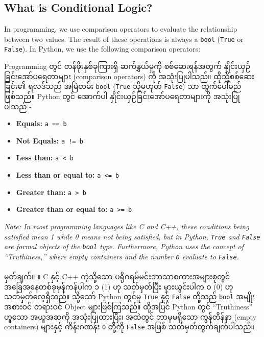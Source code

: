 \documentclass{report}
\begin{document}
\subsection{What is Conditional Logic?}
\begin{tcolorbox}[colback=blue!5!white,colframe=blue!75!black, title=\textbf{Conditional Logic using Comparison Operators}]
In programming, we use comparison operators to evaluate the relationship between two values. The result of these operations is always a \texttt{bool} (\texttt{True} or \texttt{False}). In Python, we use the following comparison operators:

{\burmesefont Programming တွင် တန်ဖိုးနှစ်ခုကြားရှိ ဆက်နွှယ်မှုကို စစ်ဆေးရန်အတွက် နှိုင်းယှဉ်ခြင်းအော်ပရေတာများ (comparison operators) ကို အသုံးပြုပါသည်။ ထိုသို့စစ်ဆေးခြင်း၏ ရလဒ်သည် အမြဲတမ်း \texttt{bool} (\texttt{True} သို့မဟုတ် \texttt{False}) သာ ထွက်ပေါ်မည်ဖြစ်သည်။ Python တွင် အောက်ပါ နှိုင်းယှဉ်ခြင်းအော်ပရေတာများကို အသုံးပြုပါသည် -}

\begin{itemize}
    \item \textbf{Equals:} \texttt{a == b}
    \item \textbf{Not Equals:} \texttt{a != b}
    \item \textbf{Less than:} \texttt{a < b}
    \item \textbf{Less than or equal to:} \texttt{a <= b}
    \item \textbf{Greater than:} \texttt{a > b}
    \item \textbf{Greater than or equal to:} \texttt{a >= b}
\end{itemize}
\end{tcolorbox}

\begin{center}
    \begin{minipage}{0.9\textwidth}
        \small \textit{Note: In most programming languages like C and C++, these conditions being satisfied mean 1 while 0 means not being satisfied, but in Python, \texttt{True} and \texttt{False} are formal objects of the \texttt{bool} type. Furthermore, Python uses the concept of ``Truthiness,'' where empty containers and the number \texttt{0} evaluate to \texttt{False}.}
        \\\\
        {\burmesefont မှတ်ချက်။ ။ C နှင့် C++ ကဲ့သို့သော ပရိုဂရမ်မင်းဘာသာစကားအများစုတွင် အခြေအနေတစ်ခုမှန်ကန်ပါက ၁ (1) ဟု သတ်မှတ်ပြီး မှားယွင်းပါက ၀ (0) ဟု သတ်မှတ်လေ့ရှိသည်။ သို့သော် Python တွင်မူ \texttt{True} နှင့် \texttt{False} တို့သည် \texttt{bool} အမျိုးအစားဝင် တရားဝင် Object များဖြစ်ကြသည်။ ထို့အပြင် Python တွင် ``Truthiness'' ဟူသော အယူအဆကို အသုံးပြုထားပြီး၊ အထဲတွင် ဘာမှမရှိသော ကွန်တိန်နာ (empty containers) များနှင့် ကိန်းဂဏန်း \texttt{0} တို့ကို \texttt{False} အဖြစ် သတ်မှတ်တွက်ချက်ပါသည်။}
    \end{minipage}
\end{center}
\end{document}
